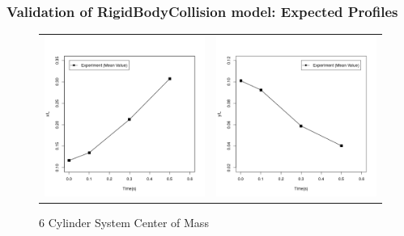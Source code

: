\documentclass{beamer}
\begin{document}
  
 \begin{frame} %
  \frametitle{Validation of RigidBodyCollision model: Expected Profiles} 
  	  \begin{figure}
 	   \begin{tabular}{cc}
 	   \includegraphics[scale=0.3]{XexpDataR.png} &\includegraphics[scale=0.3]{YexpDataR.png}
 	   \end{tabular}
 	   \caption{6 Cylinder System Center of Mass}
 	   \end{figure}
  \end{frame} 
 
\end{document}
